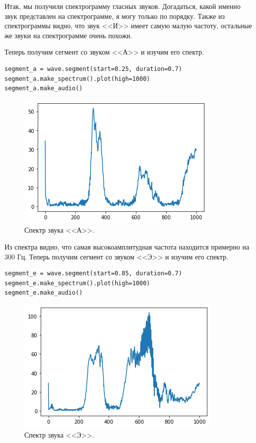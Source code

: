 \documentclass[a4paper, 14pt]{extarticle}
\begin{document}
    Итак, мы получили спектрограмму гласных звуков. Догадаться, какой именно звук представлен на спектрограмме,
    я могу только по порядку. Также из спектрограммы видно, что звук <<И>> имеет самую малую частоту, остальные же звуки
    на спектрограмме  очень похожи.

    Теперь получим сегмент со звуком <<А>> и изучим его спектр.

    \begin{lstlisting}[caption= Вывод спектра звука <<А>>., label={lst:task5_segment_a}]
segment_a = wave.segment(start=0.25, duration=0.7)
segment_a.make_spectrum().plot(high=1000)
segment_a.make_audio()
    \end{lstlisting}

    \begin{figure}[H]
        \centering
        \includegraphics[width=0.7\linewidth]{resources/Images/task6_spectrum_a}
        \caption{Спектр звука <<А>>.}
        \label{fig:task6_spectrogram}
    \end{figure}

    Из спектра видно, что самая высокоамплитудная частота находится примерно на 300 Гц.
    Теперь получим сегмент со звуком <<Э>> и изучим его спектр.

    \begin{lstlisting}[caption= Вывод спектра звука <<Э>>., label={lst:task5_segment_e}]
segment_e = wave.segment(start=0.85, duration=0.7)
segment_e.make_spectrum().plot(high=1000)
segment_e.make_audio()
    \end{lstlisting}

    \begin{figure}[H]
        \centering
        \includegraphics[width=0.7\linewidth]{resources/Images/task6_spectrum_e}
        \caption{Спектр звука <<Э>>.}
        \label{fig:task6_spectrum_e}
    \end{figure}
\end{document}
